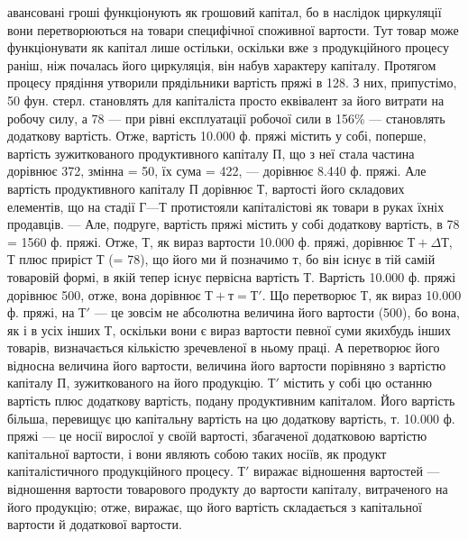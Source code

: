 \parcont{}  %
авансовані гроші функціонують як грошовий капітал, бо в наслідок
циркуляції вони перетворюються на товари специфічної споживної
вартости. Тут товар може функціонувати як капітал лише остільки,
оскільки вже з продукційного процесу раніш, ніж почалась його циркуляція,
він набув характеру капіталу. Протягом процесу прядіння утворили
прядільники вартість пряжі в 128. З них, припустімо, 50 фун.
стерл. становлять для капіталіста просто еквівалент за його витрати на
робочу силу, а 78 — при рівні експлуатації робочої сили в 156\%
— становлять додаткову вартість. Отже, вартість \num{10.000} ф. пряжі містить у
собі, поперше, вартість зужиткованого продуктивного капіталу П, що з неї
стала частина дорівнює 372, змінна = 50, їх
сума = 422, — дорівнює \num{8.440} ф. пряжі. Але вартість
продуктивного капіталу П дорівнює Т, вартості його складових елементів,
що на стадії $Г — Т$ протистояли капіталістові як товари в руках їхніх
продавців. — Але, подруге, вартість пряжі містить у собі додаткову вартість,
в 78 = 1560 ф. пряжі. Отже, $Т$, як вираз вартости \num{10.000} ф.
пряжі, дорівнює $Т + ΔТ$, $Т$ плюс приріст $Т$ (= 78), що його ми й
позначимо $т$, бо він існує в тій самій товаровій формі, в якій тепер існує
первісна вартість $Т$. Вартість \num{10.000} ф. пряжі дорівнює 500, отже,
вона дорівнює $Т + т = Т'$. Що перетворює $Т$, як вираз \num{10.000} ф. пряжі, на
$Т'$ — це зовсім не абсолютна величина його вартости (500), бо вона,
як і в усіх інших $Т$, оскільки вони є вираз вартости певної суми якихбудь
інших товарів, визначається кількістю зречевленої в ньому праці.
А перетворює його відносна величина його вартости, величина його
вартости порівняно з вартістю капіталу $П$, зужиткованого на його
продукцію. $Т'$ містить у собі цю останню вартість плюс додаткову
вартість, подану продуктивним капіталом. Його вартість більша, перевищує
цю капітальну вартість на цю додаткову вартість, $т$. \num{10.000} ф.
пряжі — це носії вирослої у своїй вартості, збагаченої додатковою вартістю
капітальної вартости, і вони являють собою таких носіїв, як
продукт капіталістичного продукційного процесу. $Т'$ виражає відношення
вартостей — відношення вартости товарового продукту до
вартости капіталу, витраченого на його продукцію; отже, виражає, що
його вартість складається з капітальної вартости й додаткової вартости.
